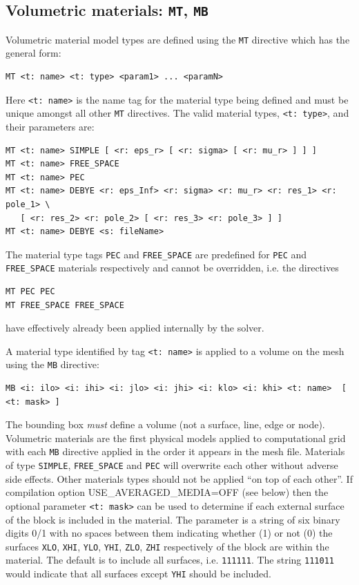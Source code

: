 \documentclass[onecolumn,a4paper]{article}
\numberwithin{equation}{section}
\begin{document}
\subsection{Volumetric materials: \texttt{MT}, \texttt{MB}}

Volumetric material model types are defined using the \texttt{MT} directive which has
the general form:
\begin{verbatim}
MT <t: name> <t: type> <param1> ... <paramN>
\end{verbatim}
Here \texttt{<t:~name>} is the name tag for the material type being defined and must be unique 
amongst all other \texttt{MT} directives. The valid material types, \texttt{<t:~type>}, and 
their parameters are:
\begin{verbatim}
MT <t: name> SIMPLE [ <r: eps_r> [ <r: sigma> [ <r: mu_r> ] ] ]
MT <t: name> FREE_SPACE
MT <t: name> PEC
MT <t: name> DEBYE <r: eps_Inf> <r: sigma> <r: mu_r> <r: res_1> <r: pole_1> \
   [ <r: res_2> <r: pole_2> [ <r: res_3> <r: pole_3> ] ] 
MT <t: name> DEBYE <s: fileName>
\end{verbatim}
The material type tags \texttt{PEC} and \texttt{FREE\_SPACE} are predefined for \texttt{PEC} 
and \texttt{FREE\_SPACE} materials respectively and cannot be overridden, i.e. the directives 
\begin{verbatim}
MT PEC PEC
MT FREE_SPACE FREE_SPACE
\end{verbatim}
have effectively already been applied internally by the solver. 

A material type identified by tag \texttt{<t:~name>} is applied to a volume on the mesh using 
the \texttt{MB} directive:
\begin{verbatim}
MB <i: ilo> <i: ihi> <i: jlo> <i: jhi> <i: klo> <i: khi> <t: name>  [ <t: mask> ]
\end{verbatim}
The bounding box {\em must} define a volume (not a surface, line, edge or node). Volumetric materials 
are the first physical models applied to computational grid with each \texttt{MB} directive applied 
in the order it appears in the mesh file. Materials of type \texttt{SIMPLE}, \texttt{FREE\_SPACE} 
and \texttt{PEC} will overwrite each other without adverse side effects. Other materials types
should not be applied ``on top of each other''. If compilation option {USE\_AVERAGED\_MEDIA=OFF}
(see below) then the optional parameter \texttt{<t:~mask>} can be used
to determine if each external surface of the block is included in the material. The parameter is a
string of six binary digits 0/1 with no spaces between them indicating whether (1) or not (0) the 
surfaces \texttt{XLO}, \texttt{XHI}, \texttt{YLO}, \texttt{YHI}, \texttt{ZLO}, \texttt{ZHI} respectively
of the block are within the material. The default is to include all surfaces, i.e. \texttt{111111}. The string
\texttt{111011} would indicate that all surfaces except \texttt{YHI} should be included.
\end{document}
